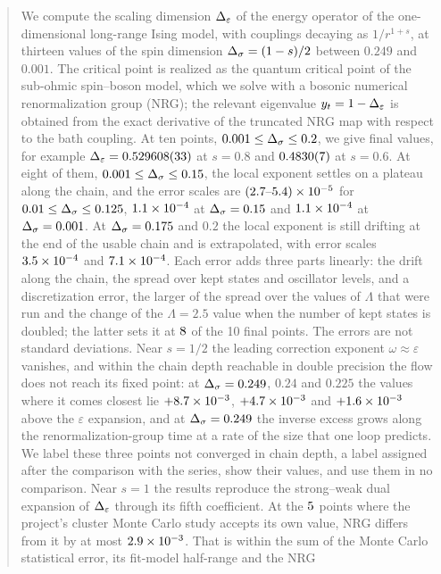 


\begin{abstract}\noindent
We compute the scaling dimension $\De$ of the energy operator of the one-dimensional long-range Ising model, with couplings
decaying as $1/r^{1+s}$, at thirteen values of the spin dimension $\Ds=(1-s)/2$ between $0.249$ and $0.001$. The critical point is
realized as the quantum critical point of the sub-ohmic spin--boson model, which we solve with a bosonic numerical renormalization
group (NRG); the relevant eigenvalue $y_t=1-\De$ is obtained from the exact derivative of the truncated NRG map with respect to the
bath coupling. At ten points, $0.001\le\Ds\le0.2$, we give final values, for example $\De=\nrgDEOneHundred$ at $s=0.8$ and
$\nrgDETwoHundred$ at $s=0.6$. At eight of them, $0.001\le\Ds\le0.15$, the local exponent settles on a plateau along the chain, and
the error scales are $\nrgerrLow$ for $0.01\le\Ds\le0.125$, $\nrgerrOneFifty$ at $\Ds=0.15$ and $\nrgerrOne$ at $\Ds=0.001$. At
$\Ds=0.175$ and $0.2$ the local exponent is still drifting at the end of the usable chain and is extrapolated, with error scales
$\nrgerrOneSeventyFive$ and $\nrgerrTwoHundred$. Each error adds three parts linearly: the drift along the chain, the spread over kept
states and oscillator levels, and a discretization error, the larger of the spread over the values of $\Lambda$ that were run and the
change of the $\Lambda=2.5$ value when the number of kept states is doubled; the latter sets it at $\nrgnLambdaKdbl$ of the 10 final
points. The errors are not standard deviations. Near $s=1/2$ the leading correction exponent $\omega\approx\varepsilon$ vanishes, and
within the chain depth reachable in double precision the flow does not reach its fixed point: at $\Ds=0.249$, $0.24$ and $0.225$ the
values where it comes closest lie $\nrgexcTwoFortyNine$, $\nrgexcTwoForty$ and $\nrgexcTwoTwentyFive$ above the $\varepsilon$
expansion, and at $\Ds=0.249$ the inverse excess grows along the renormalization-group time at a rate of the size that one loop
predicts. We label these three points not converged in chain depth, a label assigned after the comparison with the series, show
their values, and use them in no comparison. Near $s=1$ the results reproduce the strong--weak dual expansion of $\De$ through its
fifth coefficient. At the $\nrgmcAccN$ points where the project's cluster Monte Carlo study accepts its own value, NRG differs from it
by at most $\nrgmcAccDiffMax$. That is within the sum of the Monte Carlo statistical error, its fit-model half-range and the NRG

\end{abstract}
